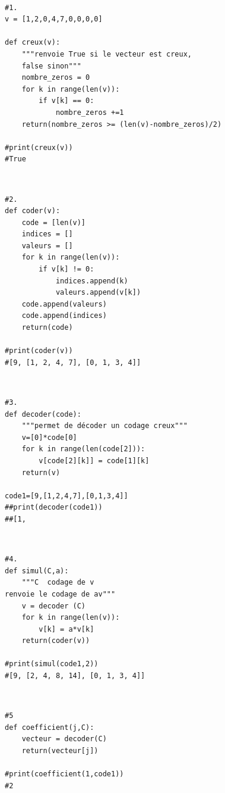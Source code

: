 \documentclass[10pt,fleqn]{article} %
\begin{document}
\begin{multicols}{2}

\begin{corrige}
$\quad$
\begin{lstlisting}
#1.
v = [1,2,0,4,7,0,0,0,0]

def creux(v):
    """renvoie True si le vecteur est creux, 
    false sinon"""
    nombre_zeros = 0
    for k in range(len(v)):
        if v[k] == 0:
            nombre_zeros +=1
    return(nombre_zeros >= (len(v)-nombre_zeros)/2)

#print(creux(v))
#True
\end{lstlisting}
\end{corrige}

\begin{corrige}
$\quad$
\begin{lstlisting}
#2.
def coder(v):
    code = [len(v)]
    indices = []
    valeurs = []
    for k in range(len(v)):
        if v[k] != 0:
            indices.append(k)
            valeurs.append(v[k])
    code.append(valeurs)
    code.append(indices)
    return(code)
    
#print(coder(v))
#[9, [1, 2, 4, 7], [0, 1, 3, 4]]    
\end{lstlisting}
\end{corrige}

\begin{corrige}
$\quad$
\begin{lstlisting}
#3. 
def decoder(code):
    """permet de décoder un codage creux"""
    v=[0]*code[0]
    for k in range(len(code[2])):
        v[code[2][k]] = code[1][k]
    return(v)

code1=[9,[1,2,4,7],[0,1,3,4]]
##print(decoder(code1))
##[1,
\end{lstlisting}
\end{corrige}

\begin{corrige}
$\quad$
\begin{lstlisting}
#4.
def simul(C,a):
    """C  codage de v
renvoie le codage de av"""
    v = decoder (C)
    for k in range(len(v)):
        v[k] = a*v[k]
    return(coder(v))

#print(simul(code1,2))
#[9, [2, 4, 8, 14], [0, 1, 3, 4]]
\end{lstlisting}
\end{corrige}

\begin{corrige}
$\quad$
\begin{lstlisting}
#5
def coefficient(j,C):
    vecteur = decoder(C)
    return(vecteur[j])

#print(coefficient(1,code1))
#2
\end{lstlisting}
\end{corrige}

\end{multicols}
\newpage
\end{document}
